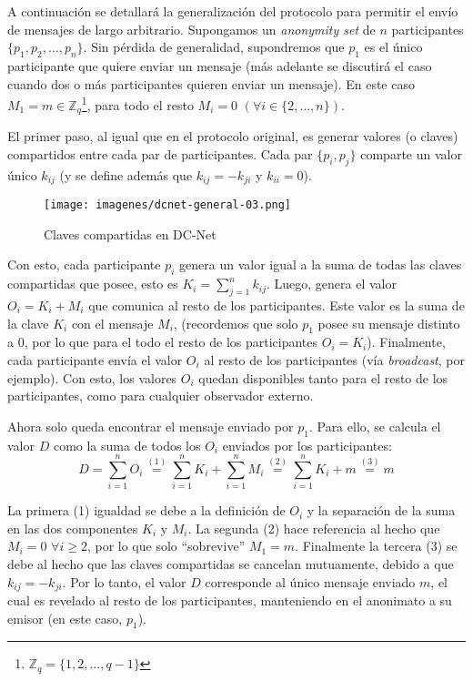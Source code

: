 A continuación se detallará la generalización del protocolo para permitir el 
envío de mensajes de largo arbitrario. Supongamos un \emph{anonymity set} de 
$n$ participantes $\{p_1, p_2, \ldots, p_n\}$. Sin pérdida de generalidad, 
supondremos que $p_1$ es el único participante que quiere enviar un mensaje 
(más adelante se discutirá el caso cuando dos o más participantes quieren 
enviar un mensaje). En este caso $M_1 = m \in 
\mathbb{Z}_q$\footnote{$\mathbb{Z}_q = \{1, 2, \ldots, q - 1\}$}, para todo el 
resto $M_i = 0$ $(\forall i \in \{2, \ldots, n\})$.

El primer paso, al igual que en el protocolo original, es generar valores (o 
claves) compartidos entre cada par de participantes. Cada par $\{p_i, p_j\}$ 
comparte un valor único $k_{ij}$ (y se define además que $k_{ij} = -k_{ji}$ y 
$k_{ii} = 0$).

\begin{figure}[H]
  \centering
    \texttt{[image: imagenes/dcnet-general-03.png]}
  \caption{Claves compartidas en DC-Net}
\end{figure}

Con esto, cada participante $p_i$ genera un valor igual a la suma de todas las 
claves compartidas que posee, esto es $K_i = \sum_{j=1}^n k_{ij}$. 
Luego, genera el valor $O_i = K_i + M_i$ que comunica al resto de los 
participantes. Este valor es la suma de la clave $K_i$ con el mensaje $M_i$, 
(recordemos que solo $p_1$ posee su mensaje distinto a 0, por lo que para el 
todo el resto de los participantes $O_i = K_i$). Finalmente, cada participante 
envía el valor $O_i$ al resto de los participantes (vía \emph{broadcast}, por 
ejemplo). Con esto, los valores $O_i$ quedan disponibles tanto para el resto 
de los participantes, como para cualquier observador externo.

Ahora solo queda encontrar el mensaje enviado por $p_1$. Para ello, se calcula 
el valor $D$ como la suma de todos los $O_i$ enviados por los participantes: 
$$D = \sum_{i=1}^n O_i \overset{(1)}{=} \sum_{i=1}^n K_i + \sum_{i=1}^n M_i 
\overset{(2)}{=} \sum_{i=1}^n K_i + m \overset{(3)}{=} m$$

La primera (1) igualdad se debe a la definición de $O_i$ y la separación de la 
suma en las dos componentes $K_i$ y $M_i$. La segunda (2) hace referencia al 
hecho que $M_i = 0$ $\forall i \geq 2$, por lo que solo ``sobrevive'' 
$M_1 = m$. Finalmente la tercera (3) se debe al hecho que las claves 
compartidas se cancelan mutuamente, debido a que $k_{ij} = -k_{ji}$. Por lo 
tanto, el valor $D$ corresponde al único mensaje enviado $m$, el cual es 
revelado al resto de los participantes, manteniendo en el anonimato a su 
emisor (en este caso, $p_1$).

